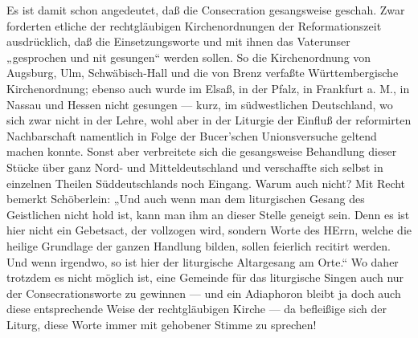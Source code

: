 Es ist damit schon angedeutet, daß die Consecration gesangsweise geschah. Zwar forderten etliche der rechtgläubigen Kirchenordnungen der Reformationszeit ausdrücklich, daß die Einsetzungsworte und mit ihnen das Vaterunser „gesprochen und nit gesungen“ werden sollen. So die Kirchenordnung von Augsburg, Ulm, Schwäbisch-Hall und die von Brenz verfaßte Württembergische Kirchenordnung; ebenso auch wurde im Elsaß, in der Pfalz, in Frankfurt a. M., in Nassau und Hessen nicht gesungen — kurz, im südwestlichen
Deutschland, wo sich zwar nicht in der Lehre, wohl aber in der Liturgie der Einfluß der reformirten Nachbarschaft namentlich in Folge der Bucer’schen Unionsversuche geltend machen konnte. Sonst aber verbreitete sich die gesangsweise Behandlung dieser Stücke über ganz Nord- und Mitteldeutschland und verschaffte sich selbst in einzelnen Theilen Süddeutschlands noch Eingang. Warum auch nicht? Mit Recht bemerkt Schöberlein: „Und auch wenn man dem liturgischen Gesang des Geistlichen nicht hold ist, kann man ihm an dieser Stelle geneigt sein. Denn es ist hier nicht ein Gebetsact, der vollzogen wird, sondern Worte des HErrn, welche die heilige Grundlage der ganzen Handlung bilden, sollen feierlich recitirt werden. Und wenn irgendwo, so ist hier der liturgische Altargesang am Orte.“ Wo daher trotzdem es nicht möglich ist, eine Gemeinde für das liturgische Singen auch nur der Consecrationsworte zu gewinnen — und ein Adiaphoron bleibt ja doch auch diese entsprechende Weise der rechtgläubigen Kirche — da befleißige sich der Liturg, diese Worte immer mit gehobener Stimme zu sprechen!

